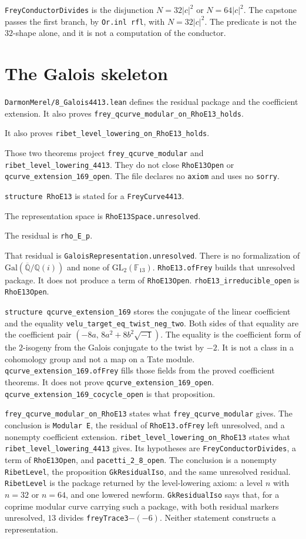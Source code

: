\documentclass[11pt]{amsart}
\begin{document}
\texttt{FreyConductorDivides} is the disjunction $N=32|c|^2$ or $N=64|c|^2$.
The capstone passes the first branch, by \texttt{Or.inl rfl}, with $N=32|c|^2$.
The predicate is not the $32$-shape alone, and it is not a computation of the conductor.

\section{The Galois skeleton}
\texttt{DarmonMerel/8\_Galois4413.lean} defines the residual package and the coefficient extension.
It also proves \texttt{frey\_qcurve\_modular\_on\_RhoE13\_holds}.
\par
It also proves \texttt{ribet\_level\_lowering\_on\_RhoE13\_holds}.
\par
Those two theorems project \texttt{frey\_qcurve\_modular} and \texttt{ribet\_level\_lowering\_4413}.
They do not close \texttt{RhoE13Open} or \texttt{qcurve\_extension\_169\_open}.
The file declares no \texttt{axiom} and uses no \texttt{sorry}.

\texttt{structure RhoE13} is stated for a \texttt{FreyCurve4413}.

The representation space is \texttt{RhoE13Space.unresolved}.
\par
The residual is \texttt{rho\_E\_p}.
\par
That residual is \texttt{GaloisRepresentation.unresolved}.
There is no formalization of $\mathrm{Gal}(\overline{\mathbb Q}/\mathbb Q(i))$ and none of $\mathrm{GL}_2(\mathbb F_{13})$.
\texttt{RhoE13.ofFrey} builds that unresolved package.
It does not produce a term of \texttt{RhoE13Open}.
\texttt{rhoE13\_irreducible\_open} is \texttt{RhoE13Open}.

\texttt{structure qcurve\_extension\_169} stores the conjugate of the linear coefficient and the equality \texttt{velu\_target\_eq\_twist\_neg\_two}.
Both sides of that equality are the coefficient pair $(-8a,\, 8a^2+8b^2\sqrt{-1})$.
The equality is the coefficient form of the $2$-isogeny from the Galois conjugate to the twist by $-2$.
It is not a class in a cohomology group and not a map on a Tate module.
\texttt{qcurve\_extension\_169.ofFrey} fills those fields from the proved coefficient theorems.
It does not prove \texttt{qcurve\_extension\_169\_open}.
\texttt{qcurve\_extension\_169\_cocycle\_open} is that proposition.

\texttt{frey\_qcurve\_modular\_on\_RhoE13} states what \texttt{frey\_qcurve\_modular} gives.
The conclusion is \texttt{Modular E}, the residual of \texttt{RhoE13.ofFrey} left unresolved, and a nonempty coefficient extension.
\texttt{ribet\_level\_lowering\_on\_RhoE13} states what \texttt{ribet\_level\_lowering\_4413} gives.
Its hypotheses are \texttt{FreyConductorDivides}, a term of \texttt{RhoE13Open}, and \texttt{pacetti\_2\_8\_open}.
The conclusion is a nonempty \texttt{RibetLevel}, the proposition \texttt{GkResidualIso}, and the same unresolved residual.
\texttt{RibetLevel} is the package returned by the level-lowering axiom: a level $n$ with $n=32$ or $n=64$, and one lowered newform.
\texttt{GkResidualIso} says that, for a coprime modular curve carrying such a package, with both residual markers unresolved, $13$ divides \texttt{freyTrace3}$-(-6)$.
Neither statement constructs a representation.
\end{document}
